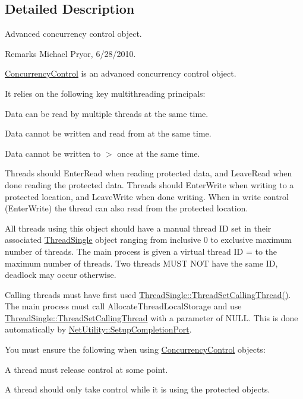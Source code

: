 \subsection{Detailed Description}
Advanced concurrency control object. \begin{DoxyRemark}{Remarks}
Michael Pryor, 6/28/2010.
\end{DoxyRemark}
\hyperlink{class_concurrency_control}{ConcurrencyControl} is an advanced concurrency control object. \par
 It relies on the following key multithreading principals:
\begin{DoxyItemize}
\item Data can be read by multiple threads at the same time.
\item Data cannot be written and read from at the same time.
\item Data cannot be written to $>$ once at the same time.
\end{DoxyItemize}

Threads should EnterRead when reading protected data, and LeaveRead when done reading the protected data. Threads should EnterWrite when writing to a protected location, and LeaveWrite when done writing. When in write control (EnterWrite) the thread can also read from the protected location.\par
\par


All threads using this object should have a manual thread ID set in their associated \hyperlink{class_thread_single}{ThreadSingle} object ranging from inclusive 0 to exclusive maximum number of threads. The main process is given a virtual thread ID = to the maximum number of threads. Two threads MUST NOT have the same ID, deadlock may occur otherwise.\par
\par


Calling threads must have first used \hyperlink{class_thread_single_a2eb55a419326e7c7d8236cf3299d2030}{ThreadSingle::ThreadSetCallingThread()}. The main process must call AllocateThreadLocalStorage and use \hyperlink{class_thread_single_a2eb55a419326e7c7d8236cf3299d2030}{ThreadSingle::ThreadSetCallingThread} with a parameter of NULL. This is done automatically by \hyperlink{class_net_utility_aa6103c1b3d6f5b366c0903ba7b22a625}{NetUtility::SetupCompletionPort}.

You must ensure the following when using \hyperlink{class_concurrency_control}{ConcurrencyControl} objects:
\begin{DoxyItemize}
\item A thread must release control at some point.
\item A thread should only take control while it is using the protected objects.
\end{DoxyItemize}

